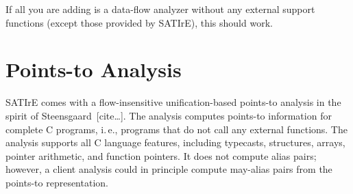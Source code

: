 \documentclass[a4paper,12pt]{report}
\begin{document}
If all you are adding is a data-flow analyzer without any external support
functions (except those provided by SATIrE), this should work.

\section{Points-to Analysis}
\label{sec:analysis_pointsto}

%
%


SATIrE comes with a flow-insensitive unification-based points-to analysis in
the spirit of Steensgaard~[cite\dots]. The analysis computes points-to
information for complete C programs, i.\,e., programs that do not call any
external functions. The analysis supports all C language features, including
typecasts, structures, arrays, pointer arithmetic, and function pointers. It
does not compute alias pairs; however, a client analysis could in principle
compute may-alias pairs from the points-to representation.
\end{document}
